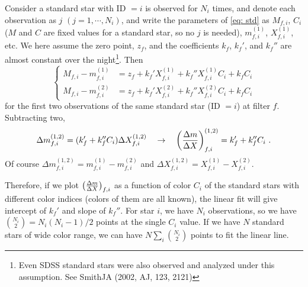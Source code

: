 Consider a standard star with ID $= i $ is observed for $ N_i $ times, and denote each observation as $ j $ $ (j = 1, \cdots, N_i) $, and write the parameters of \cref{eq: std} as $ M_{f, i} $, $ C_{i} $ ($ M $ and $ C $ are fixed values for a standard star, so no $ j $ is needed), $ m_{f, i}^{(1)} $, $ X_{f, i}^{(1)} $, etc. We here assume the zero point, $ z_f $, and the coefficients $ k_f $, $ k_f' $, and $ k_f'' $ are almost constant over the night\footnote{Even SDSS standard stars were also observed and analyzed under this assumption. See SmithJA (2002, AJ, 123, 2121)}. Then
\begin{equation}
\begin{cases}
  M_{f, i} - m_{f, i}^{(1)}
    &= z_f + k_f' X_{f, i}^{(1)} + k_f'' X_{f, i}^{(1)} C_{i} + k_f C_{i} \\
  M_{f, i} - m_{f, i}^{(2)}
    &= z_f + k_f' X_{f, i}^{(2)} + k_f'' X_{f, i}^{(2)} C_{i} + k_f C_{i}
\end{cases}
\end{equation}
for the first two observations of the same standard star (ID $= i $) at filter $ f $. Subtracting two,
\begin{equation}
  \Delta m_{f, i}^{(1, 2)} 
    = (k_f' + k_f'' C_i) \Delta X_{f, i}^{(1, 2)} 
  \quad\rightarrow\quad
  \qty( \frac{\Delta m }{\Delta X} )_{f, i}^{(1, 2)}
    = k_f' + k_f'' C_i ~.
\end{equation}
Of course $ \Delta m_{f, i}^{(1, 2)}  = m_{f, i}^{(1)} - m_{f, i}^{(2)} $ and $ \Delta X_{f, i}^{(1, 2)}  = X_{f, i}^{(1)} - X_{f, i}^{(2)} $. 

Therefore, if we plot $ \qty ( \frac{\Delta m }{\Delta X} )_{f, i} $ as a function of color $ C_i $ of the standard stars with different color indices (colors of them are all known), the linear fit will give intercept of $ k_f' $ and slope of $ k_f'' $. For star $ i $, we have $ N_i $ observations, so we have $ \binom{N_i}{2} = N_i (N_i - 1) / 2 $ points at the single $ C_i $ value. If we have $ N $ standard stars of wide color range, we can have $ N \sum_i \binom{N_i}{2} $ points to fit the linear line.